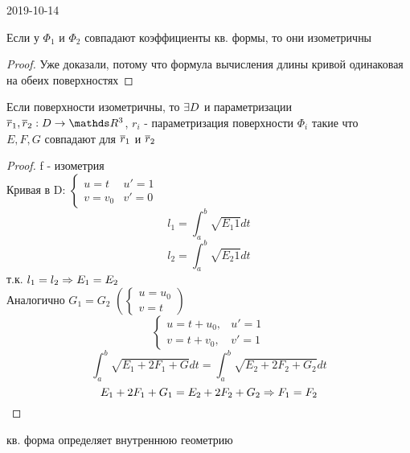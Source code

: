 \documentclass[main]{subfiles}
\begin{document}
\begin{lect} {2019-10-14}
	  \begin{theorem}
	    Если у $\Phi_1$ и $\Phi_2$ совпадают коэффициенты  кв. формы, то они изометричны
	  \end{theorem}

	  \begin{proof}
	    Уже доказали, потому что формула вычисления длины кривой одинаковая на обеих поверхностях
	  \end{proof}

	  \begin{remark}
	    Если поверхности изометричны, то $\exists D$ и параметризации\\ 
        $\ol{r}_1, \ol{r}_2: D \ra \R^3$, $r_i$ - параметризация поверхности $\Phi_i$ такие что\\
        $E,F,G$ совпадают для $\overline{r}_1$ и $\overline{r}_2$
	  \end{remark}

	  \begin{proof}
	    f - изометрия\\
	    Кривая в D: $\begin{cases}
	      u = t & u'=1\\
	      v=v_0  & v'=0
	    \end{cases}$
	    \[l_1 = \int_a^b \sqrt{E_1 1} dt\]
	    \[l_2 = \int_a^b \sqrt{E_2 1} dt\]
	    т.к. $l_1 = l_2 \Rightarrow E_1 = E_2$\\
	    Аналогично $G_1 = G_2$ $\left(\begin{cases}
	      u=u_0\\
	      v=t
	    \end{cases}\right)$
	    \[\begin{cases}
	      u = t + u_0, & u' = 1\\
	      v = t + v_0, & v' = 1
	    \end{cases}\]
	    \[\int_a^b \sqrt{E_1 + 2 F_1 + G} dt = \int_a^b \sqrt{E_2 + 2F_2 + G_2} dt\]
	    \[E_1 + 2F_1 + G_1 = E_2+ 2 F_2 + G_2 \Rightarrow F_1 = F_2\]
	  \end{proof}

	  \begin{consequence}
	     кв. форма определяет внутреннюю геометрию
	  \end{consequence}



\end{lect}
\end{document}
